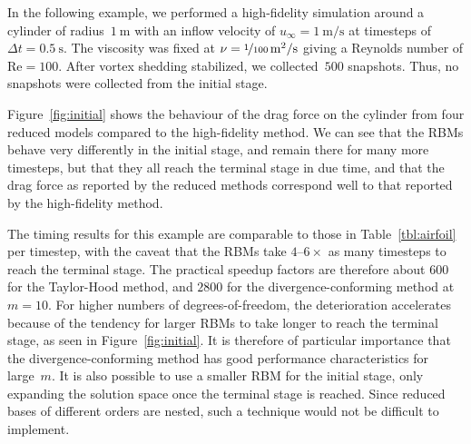 \documentclass[a4paper]{jpconf}
\begin{document}
In the following example, we performed a high-fidelity simulation
around a cylinder of radius~$\SI{1}{\meter}$ with an inflow velocity
of $u_\infty = \SI{1}{\meter/\second}$ at timesteps of
$\Delta t = \SI{0.5}{\second}$.  The viscosity was fixed at
$\nu = \SI[parse-numbers=false]{\nicefrac{1}{100}}{\meter^2/\second}$
giving a Reynolds number of $\text{Re} = 100$.  After vortex shedding
stabilized, we collected~$500$ snapshots.  Thus, no snapshots were
collected from the initial stage.

Figure~\ref{fig:initial} shows the behaviour of the drag force on the
cylinder from four reduced models compared to the high-fidelity
method.  We can see that the RBMs behave very differently in the
initial stage, and remain there for many more timesteps, but that they
all reach the terminal stage in due time, and that the drag force as
reported by the reduced methods correspond well to that reported by
the high-fidelity method.

The timing results for this example are comparable to those in
Table~\ref{tbl:airfoil} per timestep, with the caveat that the RBMs
take $4$--$6 \times$ as many timesteps to reach the terminal stage.
The practical speedup factors are therefore about $600$ for the
Taylor-Hood method, and $2800$ for the divergence-conforming method at
$m=10$.  For higher numbers of degrees-of-freedom, the deterioration
accelerates because of the tendency for larger RBMs to take longer to
reach the terminal stage, as seen in Figure~\ref{fig:initial}.  It is
therefore of particular importance that the divergence-conforming
method has good performance characteristics for large~$m$.  It is also
possible to use a smaller RBM for the initial stage, only expanding
the solution space once the terminal stage is reached.  Since reduced
bases of different orders are nested, such a technique would not be
difficult to implement.
\end{document}
